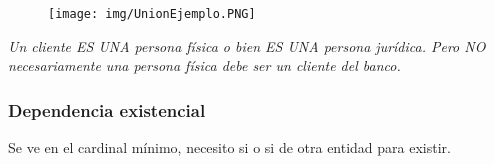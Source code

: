 \begin{figure}[!htb]
    \centering
    \texttt{[image: img/UnionEjemplo.PNG]}
\end{figure}

\textit{Un cliente ES UNA persona física o bien ES UNA persona jurídica. Pero NO
necesariamente una persona física debe ser un cliente del banco.}

\subsubsection*{Dependencia existencial}
Se ve en el cardinal mínimo, necesito si o si de otra entidad para existir.

